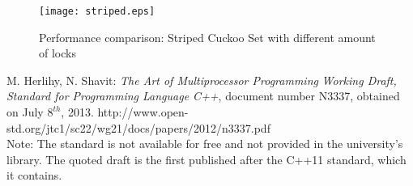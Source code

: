 \documentclass[a4paper,10pt]{article}
\begin{document}
\begin{figure}[H]
\begin{center}
\texttt{[image: striped.eps]}
\end{center}
\caption{Performance comparison: Striped Cuckoo Set with different amount of locks}
\label{fig:plot3}
\end{figure}


\begin{thebibliography}{9}
    M. Herlihy, N. Shavit:
   \emph{The Art of Multiprocessor Programming}
	\emph{Working Draft, Standard for Programming Language C++},
	document number N3337, obtained on July $8^{th}$, 2013.	
	http://www.open-std.org/jtc1/sc22/wg21/docs/papers/2012/n3337.pdf \\
    Note: The standard is not available for free and not provided in the
    university's  library. The quoted draft is the first published after the
    C++11 standard, which it contains.

\end{thebibliography}
\end{document}
